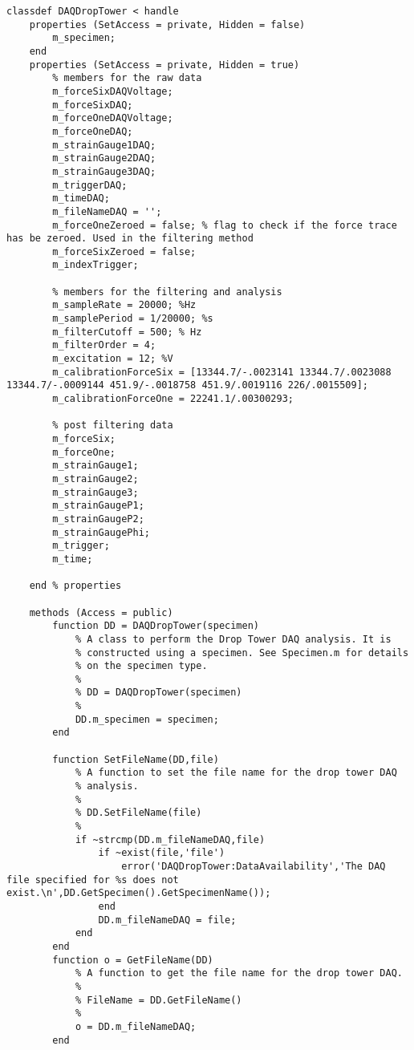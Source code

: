 \begin{lstlisting}
classdef DAQDropTower < handle
    properties (SetAccess = private, Hidden = false)
        m_specimen;    
    end
    properties (SetAccess = private, Hidden = true)
        % members for the raw data
        m_forceSixDAQVoltage;
        m_forceSixDAQ;
        m_forceOneDAQVoltage;
        m_forceOneDAQ;
        m_strainGauge1DAQ;
        m_strainGauge2DAQ;
        m_strainGauge3DAQ;
        m_triggerDAQ;
        m_timeDAQ;
        m_fileNameDAQ = '';
        m_forceOneZeroed = false; % flag to check if the force trace has be zeroed. Used in the filtering method
        m_forceSixZeroed = false;
        m_indexTrigger;
        
        % members for the filtering and analysis
        m_sampleRate = 20000; %Hz
        m_samplePeriod = 1/20000; %s
        m_filterCutoff = 500; % Hz
        m_filterOrder = 4;
        m_excitation = 12; %V
        m_calibrationForceSix = [13344.7/-.0023141 13344.7/.0023088 13344.7/-.0009144 451.9/-.0018758 451.9/.0019116 226/.0015509];
        m_calibrationForceOne = 22241.1/.00300293;
        
        % post filtering data
        m_forceSix;
        m_forceOne;
        m_strainGauge1;
        m_strainGauge2;
        m_strainGauge3;
        m_strainGaugeP1;
        m_strainGaugeP2;
        m_strainGaugePhi;
        m_trigger;
        m_time;
        
    end % properties
    
    methods (Access = public)
        function DD = DAQDropTower(specimen)
            % A class to perform the Drop Tower DAQ analysis. It is
            % constructed using a specimen. See Specimen.m for details
            % on the specimen type.
            %
            % DD = DAQDropTower(specimen)
            %
            DD.m_specimen = specimen;
        end
        
        function SetFileName(DD,file)
            % A function to set the file name for the drop tower DAQ
            % analysis.
            %
            % DD.SetFileName(file)
            %
            if ~strcmp(DD.m_fileNameDAQ,file)
                if ~exist(file,'file')
                    error('DAQDropTower:DataAvailability','The DAQ file specified for %s does not exist.\n',DD.GetSpecimen().GetSpecimenName());
                end
                DD.m_fileNameDAQ = file;
            end
        end
        function o = GetFileName(DD)
            % A function to get the file name for the drop tower DAQ.
            %
            % FileName = DD.GetFileName()
            %
            o = DD.m_fileNameDAQ;
        end
        

\end{lstlisting}

